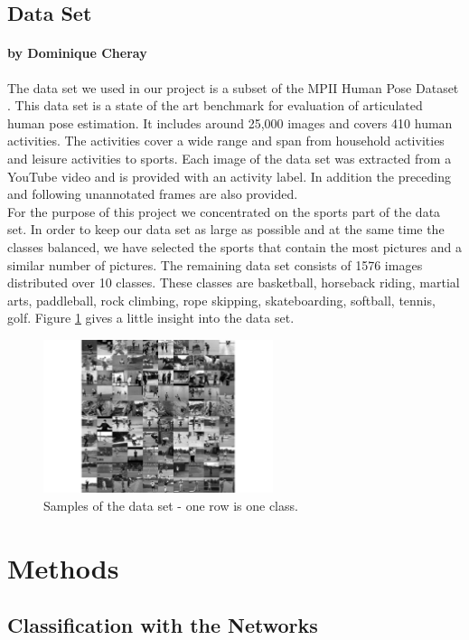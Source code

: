 \documentclass[11pt]{report}
\begin{document}
\section{Data Set}
\label{dataset}
\subsubsection{by Dominique Cheray}
The data set we used in our project is a subset of the MPII Human Pose Dataset
\cite{andriluka20142d}. This data set is a state of the art benchmark for
evaluation of articulated human pose estimation. It includes around
25,000 images and covers 410 human activities. The activities cover a wide range
and span from household activities and leisure activities to sports. Each image
of the data set was extracted from a YouTube video and is provided with an
activity label. In addition the preceding and following unannotated frames are
also provided. \\
For the purpose of this project we concentrated on the sports part of the
data set. In order to keep our data set as large as possible and at the same
time the classes balanced, we have selected the sports that contain the most
pictures and a similar number of pictures. The remaining data set consists of
1576 images distributed over 10 classes. These classes are basketball, horseback
riding, martial arts, paddleball, rock climbing, rope skipping, skateboarding,
softball, tennis, golf. Figure \ref{plotgrid} gives a little insight into the
data set. 
\begin{figure}
  \centering
  \includegraphics[width=0.6\textwidth]{plotgrid}
  \caption{Samples of the data set - one row is one class.}
  \label{plotgrid}
\end{figure}

\chapter{Methods}
\section{Classification with the Networks}
\end{document}
